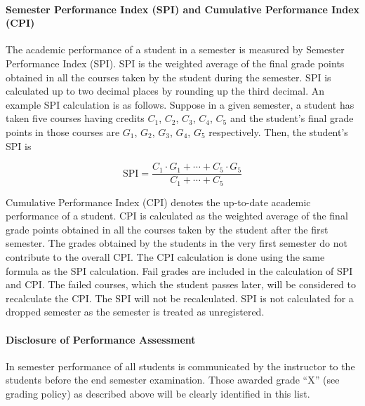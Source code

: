 \paragraph{Semester Performance Index (SPI) and Cumulative Performance Index (CPI) \label{lab:SPICPI}} The academic performance of a student in a semester is measured by Semester Performance Index (SPI). SPI is the weighted average of the final grade points obtained in all the courses taken by the student during the semester. SPI is calculated up to two decimal places by rounding up the third decimal. An example SPI calculation is as follows. Suppose in a given semester, a student has taken five courses having credits $C_1$, $C_2$, $C_3$, $C_4$, $C_5$ and the student’s final grade points in those courses are $G_1$, $G_2$, $G_3$, $G_4$, $G_5$ respectively. Then, the student’s SPI is

\begin{equation}
    \mathrm{SPI}=\frac{C_1\cdot G_1+ \cdots + C_5 \cdot G_5}{C_1+ \cdots +C_5}
    \label{SPI Calculation}
\end{equation}

Cumulative Performance Index (CPI) denotes the up-to-date academic performance of a student. CPI is calculated as the weighted average of the final grade points obtained in all the courses taken by the student after the first semester. The grades obtained by the students in the very first semester do not contribute to the overall CPI. The CPI calculation is done using the same formula as the SPI calculation. Fail grades are included in the calculation of SPI and CPI. The failed courses, which the student passes later, will be considered to recalculate the CPI. The SPI will not be recalculated. SPI is not calculated for a dropped semester as the semester is treated as unregistered. 

\paragraph{Disclosure of Performance Assessment} In semester performance of all students is communicated by the instructor to the students before the end semester examination. Those awarded grade “X” (see grading policy) as described above will be clearly identified in this list.


